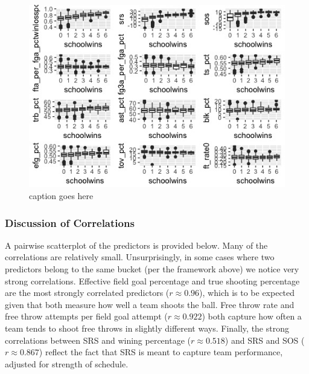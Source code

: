 \documentclass[10pt,a4paper, hidelinks]{article} %
\begin{document}
\begin{figure}[H]
	\centering
	\includegraphics[width=1\linewidth]{../fig/RayleighWetDream}
	\caption{caption goes here}
	\label{fig:rayleighwetdream}
\end{figure}

\subsubsection{Discussion of Correlations}

A pairwise scatterplot of the predictors is provided below. Many of the correlations are relatively small. Unsurprisingly, in some cases where two predictors belong to the same bucket (per the framework above) we notice very strong correlations. Effective field goal percentage and true shooting percentage are the most strongly correlated predictors ($r \approx 0.96$), which is to be expected given that both measure how well a team shoots the ball. Free throw rate and free throw attempts per field goal attempt ($r \approx 0.922$) both capture how often a team tends to shoot free throws in slightly different ways. Finally, the strong correlations between SRS and wining percentage ($r \approx 0.518$) and SRS and SOS ($r \approx 0.867$) reflect the fact that SRS is meant to capture team performance, adjusted for strength of schedule.
\end{document}
